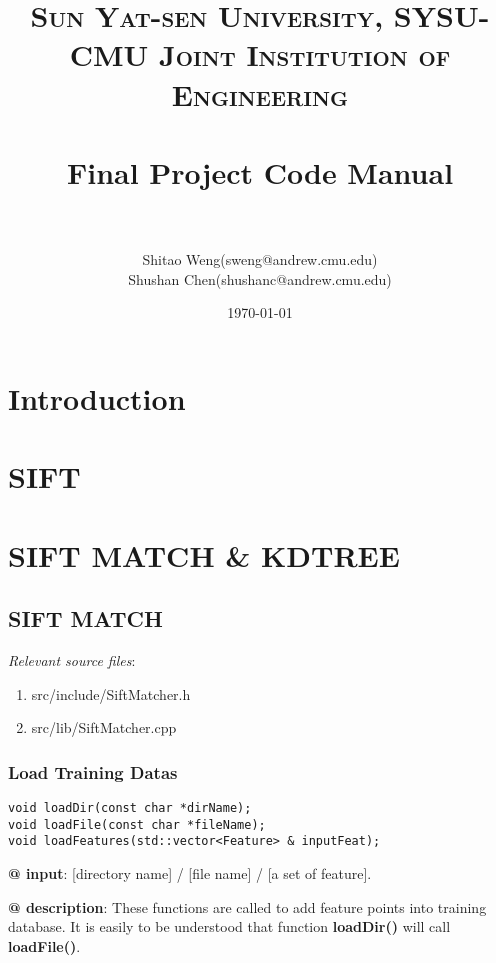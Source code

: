 \documentclass[paper=a4, fontsize=11pt]{scrartcl} %
\title{	
\normalfont \normalsize 
\textsc{Sun Yat-sen University, SYSU-CMU Joint Institution of Engineering} \\ [25pt] %
\horrule{0.5pt} \\[0.4cm] %
\huge Final Project Code Manual\\ %
\horrule{2pt} \\[0.5cm] %
}
\author{Shitao Weng(sweng@andrew.cmu.edu) \\ Shushan Chen(shushanc@andrew.cmu.edu)} %
\date{\normalsize\today} %
\numberwithin{equation}{section} %
\numberwithin{figure}{section} %
\numberwithin{table}{section} %
\begin{document}

\maketitle %

\tableofcontents

\section{Introduction}

\section{SIFT}

\section{SIFT MATCH \& KDTREE}

\subsection{SIFT MATCH}

\textsl{Relevant source files}: 

\begin{enumerate}
\item src/include/SiftMatcher.h
\item src/lib/SiftMatcher.cpp
\end{enumerate}


\subsubsection{Load Training Datas}

\begin{lstlisting}
void loadDir(const char *dirName);
void loadFile(const char *fileName);
void loadFeatures(std::vector<Feature> & inputFeat);
\end{lstlisting}

\textbf{@ input}: [directory name] / [file name] / [a set of feature].

\textbf{@ description}: These functions are called to add feature points into training database. It is easily to be understood that function \textbf{loadDir()} will call \textbf{loadFile()}. \\
\end{document}
